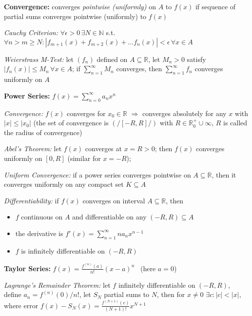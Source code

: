\documentclass[8pt,twoside]{extarticle}
\begin{document}
\begin{multicols}{2}
\textbf{Convergence:} converges \textit{pointwise (uniformly)} on $A$ to $f(x)$ if sequence of partial sums converges pointwise (uniformly) to $f(x)$

\textit{Cauchy Criterion:} $\forall \epsilon>0 \,\exists N\in \mathbb{N}$ s.t.\ $\forall n>m\geq N: |f_{m+1}(x) + f_{m+2}(x) + ... f_{n}(x)| <\epsilon \,\forall x\in A$

 \textit{Weierstrass M-Test:} let $(f_n)$ defined on $A\subseteq \mathbb{R}$, let $M_n>0$ satisfy $|f_n(x)|\leq M_n \,\forall x\in A$; if $\sum_{n=1}^\infty M_n$ converges, then $\sum_{n=1}^\infty f_n$ converges uniformly on $A$
 
 \textbf{Power Series:} $f(x)=\sum_{n=0}^\infty a_nx^n$

\textit{Convergence:} $f(x)$ converges for $x_0\in \mathbb{R}$ $\Rightarrow$ converges absolutely for any $x$ with $|x|\leq |x_0|$ (the set of convergence is $(/[-R,R]/)$ with $R\in\mathbb{R}_0^+ \cup \infty$, $R$ is called the radius of convergence)

\textit{Abel's Theorem:} let $f(x)$ converges at $x=R>0$; then $f(x)$ converges uniformly on $[0,R]$ (similar for $x=-R$);

\textit{Uniform Convergence:} if a power series converges pointwise on $A\subseteq \mathbb{R}$, then it converges uniformly on any compact set $K\subseteq A$


\textit{Differentiability:} if $f(x)$ converges on interval $A\subseteq \mathbb{R}$, then

\begin{itemize}[itemsep=0em, topsep=0pt, partopsep=0pt,parsep=0pt, leftmargin=1.0em]
\item $f$ continuous on $A$ and differentiable on any $(-R,R)\subseteq A$
\item the derivative is $f'(x)=\sum_{n=1}^\infty na_nx^{n-1}$
\item $f$ is infinitely differentiable on $(-R,R)$ 
\end{itemize} 

\textbf{Taylor Series:}  $f(x)=\frac{f^{(n)}(a)}{n!} (x-a)^n$ \,\,\,(here $a=0$)

\textit{Lagrange's Remainder Theorem:} let $f$ infinitely differentiable on $(-R,R)$, define $a_n=f^{(n)}(0)/n!$, let $S_N$ partial sums to $N$, then for $x\neq 0$ $\exists c:|c|{<}|x|$, where error $f(x){-}S_N(x)=\frac{f^{(N+1)}(c)}{(N+1)!}x^{N+1}$



\end{multicols}
\end{document}
